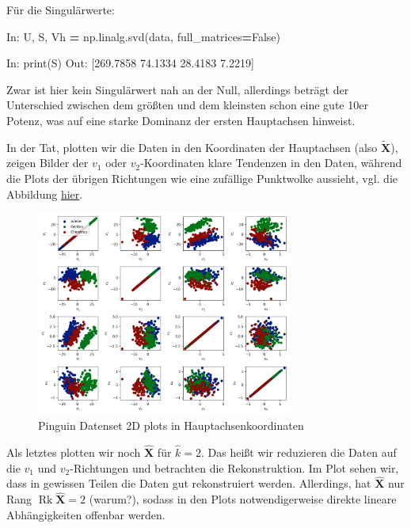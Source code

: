 \documentclass[]{book}
\newenvironment{Shaded}{\begin{snugshade}}{\end{snugshade}}
\newcommand{\BuiltInTok}[1]{#1}
\newcommand{\FloatTok}[1]{\textcolor[rgb]{0.00,0.00,0.81}{#1}}
\newcommand{\NormalTok}[1]{#1}
\newcommand{\OperatorTok}[1]{\textcolor[rgb]{0.81,0.36,0.00}{\textbf{#1}}}
\newcommand{\VariableTok}[1]{\textcolor[rgb]{0.00,0.00,0.00}{#1}}
\theoremstyle{definition}
\theoremstyle{definition}
\theoremstyle{definition}
\theoremstyle{definition}
\theoremstyle{remark}
\begin{document}
Für die Singulärwerte:

\begin{Shaded}
\begin{Highlighting}[]
\NormalTok{In: U, S, Vh }\OperatorTok{=}\NormalTok{ np.linalg.svd(data, full_matrices}\OperatorTok{=}\VariableTok{False}\NormalTok{)}

\NormalTok{In: }\BuiltInTok{print}\NormalTok{(S)}
\NormalTok{Out: [}\FloatTok{269.7858}  \FloatTok{74.1334}  \FloatTok{28.4183}   \FloatTok{7.2219}\NormalTok{]}
\end{Highlighting}
\end{Shaded}

Zwar ist hier kein Singulärwert nah an der Null, allerdings beträgt der Unterschied zwischen dem größten und dem kleinsten schon eine gute 10er Potenz, was auf eine starke Dominanz der ersten Hauptachsen hinweist.

In der Tat, plotten wir die Daten in den Koordinaten der Hauptachsen (also \(\tilde {\mathbf{X}}\)), zeigen Bilder der \(v_1\) oder \(v_2\)-Koordinaten klare Tendenzen in den Daten, während die Plots der übrigen Richtungen wie eine zufällige Punktwolke aussieht, vgl. die Abbildung \protect\hyperlink{fig:05-penguin-allpairs-pcs}{hier}.

\begin{figure}
\hypertarget{fig:05-penguin-allpairs-pcs}{%
\centering
\includegraphics[width=0.75\textwidth,height=\textheight]{bilder/05-all-pairs-pcs.png}
\caption{Pinguin Datenset 2D plots in Hauptachsenkoordinaten}\label{fig:05-penguin-allpairs-pcs}
}
\end{figure}

Als letztes plotten wir noch \(\hat {{\mathbf{X}}}\) für \(\hat k =2\). Das heißt wir reduzieren die Daten auf die \(v_1\) und \(v_2\)-Richtungen und betrachten die Rekonstruktion. Im Plot sehen wir, dass in gewissen Teilen die Daten gut rekonstruiert werden. Allerdings, hat \(\hat{{\mathbf{X}}}\) nur Rang \(\operatorname{Rk} \hat {{\mathbf{X}}}=2\) (warum?), sodass in den Plots notwendigerweise direkte lineare Abhängigkeiten offenbar werden.
\end{document}
